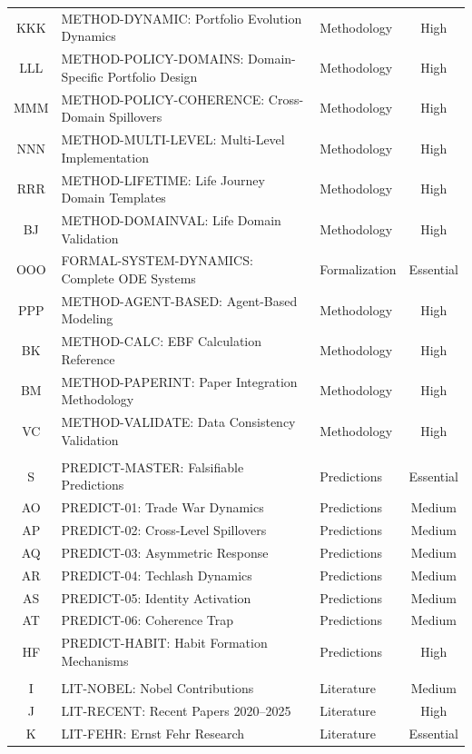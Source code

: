 \begin{table}[htbp]
\begin{tabular}{@{}cllc@{}}
KKK & METHOD-DYNAMIC: Portfolio Evolution Dynamics & Methodology & High \\
LLL & METHOD-POLICY-DOMAINS: Domain-Specific Portfolio Design & Methodology & High \\
MMM & METHOD-POLICY-COHERENCE: Cross-Domain Spillovers & Methodology & High \\
NNN & METHOD-MULTI-LEVEL: Multi-Level Implementation & Methodology & High \\
RRR & METHOD-LIFETIME: Life Journey Domain Templates & Methodology & High \\
BJ & METHOD-DOMAINVAL: Life Domain Validation & Methodology & High \\
OOO & FORMAL-SYSTEM-DYNAMICS: Complete ODE Systems & Formalization & Essential \\
PPP & METHOD-AGENT-BASED: Agent-Based Modeling & Methodology & High \\
BK & METHOD-CALC: EBF Calculation Reference & Methodology & High \\
BM & METHOD-PAPERINT: Paper Integration Methodology & Methodology & High \\
VC & METHOD-VALIDATE: Data Consistency Validation & Methodology & High \\
\addlinespace
\multicolumn{4}{@{}l}{\textit{\textbf{PREDICT (8)}}} \\
S & PREDICT-MASTER: Falsifiable Predictions & Predictions & Essential \\
AO & PREDICT-01: Trade War Dynamics & Predictions & Medium \\
AP & PREDICT-02: Cross-Level Spillovers & Predictions & Medium \\
AQ & PREDICT-03: Asymmetric Response & Predictions & Medium \\
AR & PREDICT-04: Techlash Dynamics & Predictions & Medium \\
AS & PREDICT-05: Identity Activation & Predictions & Medium \\
AT & PREDICT-06: Coherence Trap & Predictions & Medium \\
HF & PREDICT-HABIT: Habit Formation Mechanisms & Predictions & High \\
\addlinespace
\multicolumn{4}{@{}l}{\textit{\textbf{LIT (30)}}} \\
I & LIT-NOBEL: Nobel Contributions & Literature & Medium \\
J & LIT-RECENT: Recent Papers 2020--2025 & Literature & High \\
K & LIT-FEHR: Ernst Fehr Research & Literature & Essential \\

\end{tabular}
\end{table}
